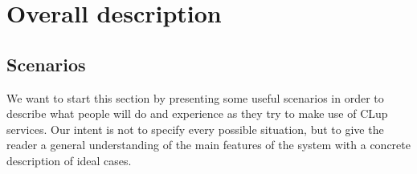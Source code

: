 \section{Overall description}
\label{sect:overalldescription}



\subsection{Scenarios}
\label{subsect:scenarios}

We want to start this section by presenting some useful scenarios in order to describe what people will do and experience as they try to make use of CLup services. Our intent is not to specify every possible situation, but to give the reader a general understanding of the main features of the system with a concrete description of ideal cases.
 

